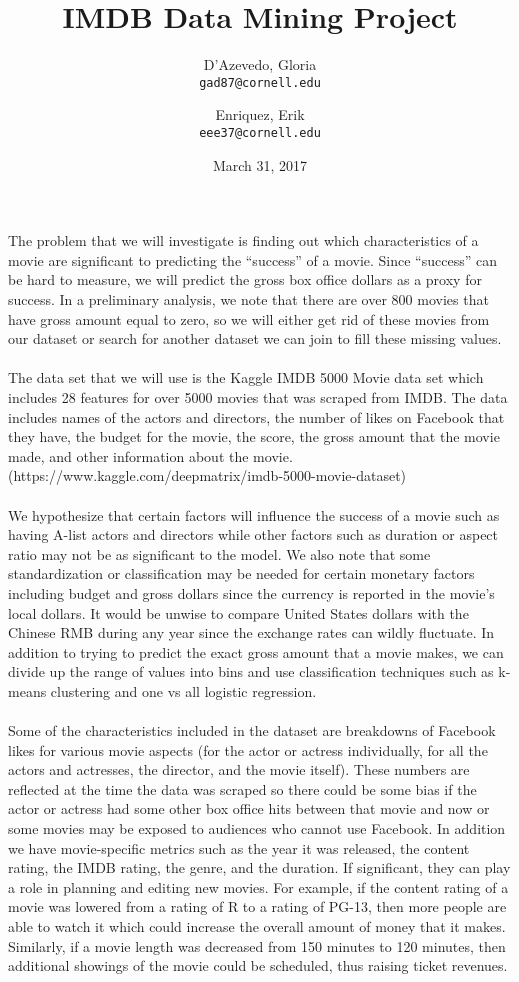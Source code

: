 \documentclass{article}
\title{IMDB Data Mining Project}
\author{
  D'Azevedo, Gloria\\
  \texttt{gad87@cornell.edu}
  \and
  Enriquez, Erik\\
  \texttt{eee37@cornell.edu}
}
\date{March 31, 2017}
\begin{document}
\maketitle

The problem that we will investigate is finding out which characteristics of a movie are significant to predicting the ``success'' of a movie.  Since ``success'' can be hard to measure, we will predict the gross box office dollars as a proxy for success.  In a preliminary analysis, we note that there are over 800 movies that have gross amount equal to zero, so we will either get rid of these movies from our dataset or search for another dataset we can join to fill these missing values.\\
\\
The data set that we will use is the Kaggle IMDB 5000 Movie data set which includes 28 features for over 5000 movies that was scraped from IMDB.  The data includes names of the actors and directors, the number of likes on Facebook that they have, the budget for the movie, the score, the gross amount that the movie made, and other information about the movie. (https://www.kaggle.com/deepmatrix/imdb-5000-movie-dataset) \\
\\
We hypothesize that certain factors will  influence the success of a movie such as having A-list actors and directors while other factors such as duration or aspect ratio may not be as significant to the model.  We also note that some standardization or classification may be needed for certain monetary factors including budget and gross dollars since the currency is reported in the movie's local dollars.  It would be unwise to compare United States dollars with the Chinese RMB during any year since the exchange rates can wildly fluctuate.  In addition to trying to predict the exact gross amount that a movie makes, we can divide up the range of values into bins and use classification techniques such as k-means clustering and one vs all logistic regression. \\
\\
Some of the characteristics included in the dataset are breakdowns of Facebook likes for various movie aspects (for the actor or actress individually, for all the actors and actresses, the director, and the movie itself).  These numbers are reflected at the time the data was scraped so there could be some bias if the actor or actress had some other box office hits between that movie and now or some movies may be exposed to audiences who cannot use Facebook.  In addition we have movie-specific metrics such as the year it was released, the content rating, the IMDB rating, the genre, and the duration.  If significant, they can play a role in planning and editing new movies.  For example, if the content rating of a movie was lowered from a rating of R to a rating of PG-13, then more people are able to watch it which could increase the overall amount of money that it makes.  Similarly, if a movie length was decreased from 150 minutes to 120 minutes, then additional showings of the movie could be scheduled, thus raising ticket revenues.\\
\end{document}
